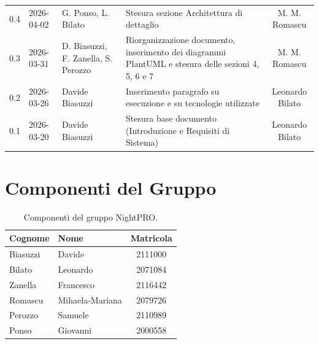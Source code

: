 \documentclass[a4paper, 11pt, oneside]{scrartcl}
\begin{document}
\begin{center}
{\begin{tabular}{@{}llp{}p{}c@{}}
            0.4               & 2026-04-02    & G. Ponso, L. Bilato   & Stesura sezione Architettura di dettaglio & M. M. Romascu\\
            0.3               & 2026-03-31    & D. Biasuzzi, F. Zanella, S. Perozzo    & Riorganizzazione documento, inserimento dei diagrammi PlantUML e stesura delle sezioni 4, 5, 6 e 7 & M. M. Romascu\\
            0.2               & 2026-03-26    & Davide Biasuzzi   & Inserimento paragrafo su esecuzione e su tecnologie utilizzate & Leonardo Bilato       \\
            0.1               & 2026-03-20    & Davide Biasuzzi   & Stesura base documento (Introduzione e Requisiti di Sistema)   & Leonardo Bilato       \\
            \bottomrule
        \end{tabular}
    }
\end{center}

\newpage
\tableofcontents
\listoffigures
\listoftables
\pagestyle{fancy}

\newpage
\section*{Componenti del Gruppo}

\begin{table}[H]
    \centering
    \renewcommand{\arraystretch}{1.2}
    \begin{tabular}{@{}llc@{}}
        \toprule
        \textbf{Cognome} & \textbf{Nome}   & \textbf{Matricola} \\
        \midrule
        Biasuzzi         & Davide          & 2111000            \\
        Bilato           & Leonardo        & 2071084            \\
        Zanella          & Francesco       & 2116442            \\
        Romascu          & Mihaela-Mariana & 2079726            \\
        Perozzo          & Samuele         & 2110989            \\
        Ponso            & Giovanni        & 2000558            \\
        \bottomrule
    \end{tabular}
    \caption{Componenti del gruppo NightPRO.}
\end{table}
\end{document}
